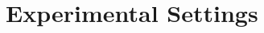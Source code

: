 \documentclass[12pt]{article}
\begin{document}

\section{Experimental Settings}
\label{sec:experimental-settings}
\end{document}
